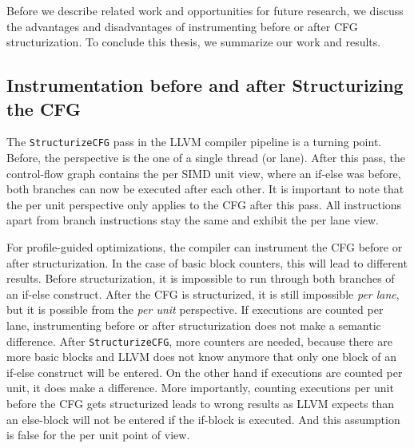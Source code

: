 \clearpage
{}
\label{sec:discussion}
Before we describe related work and opportunities for future research, we discuss the advantages and disadvantages of instrumenting before or after CFG structurization.
To conclude this thesis, we summarize our work and results.

\subsection{Instrumentation before and after Structurizing the CFG}
\label{sub:discussion_structurize}
The \texttt{StructurizeCFG} pass in the LLVM compiler pipeline is a turning point. Before, the perspective is the one of a single thread (or lane).
After this pass, the control-flow graph contains the per SIMD unit view, where an if-else was before, both branches can now be executed after each other.
It is important to note that the per unit perspective only applies to the CFG after this pass. All instructions apart from branch instructions stay the same and exhibit the per lane view.

For profile-guided optimizations, the compiler can instrument the CFG before or after structurization. In the case of basic block counters, this will lead to different results.
Before structurization, it is impossible to run through both branches of an if-else construct.
After the CFG is structurized, it is still impossible \emph{per lane}, but it is possible from the \emph{per unit} perspective.
If executions are counted per lane, instrumenting before or after structurization does not make a semantic difference.
After \texttt{StructurizeCFG}, more counters are needed, because there are more basic blocks and LLVM does not know anymore that only one block of an if-else construct will be entered.
On the other hand if executions are counted per unit, it does make a difference. More importantly, counting executions per unit before the CFG gets structurized leads to wrong results as LLVM expects than an else-block will not be entered if the if-block is executed. And this assumption is false for the per unit point of view.

